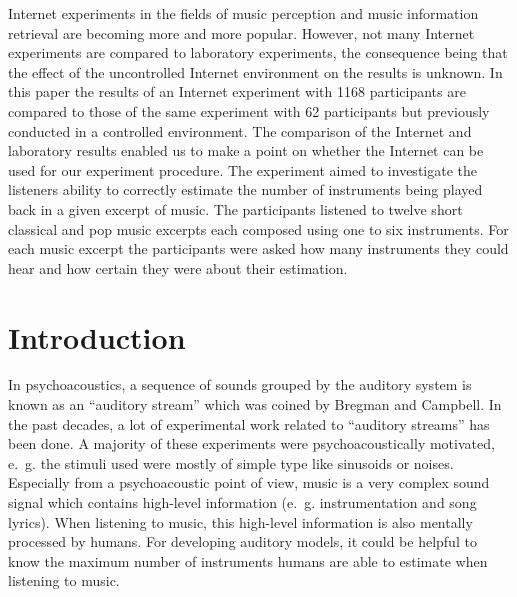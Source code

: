 %

Internet experiments in the fields of music perception and music information retrieval are becoming more and more popular. However, not many Internet experiments are compared to laboratory experiments, the consequence being that the effect of the uncontrolled Internet environment on the results is unknown.
In this paper the results of an Internet experiment with 1168 participants are compared to those of the same experiment with 62 participants but previously conducted in a controlled environment. The comparison of the Internet and laboratory results enabled us to make a point on whether the Internet can be used for our experiment procedure. The experiment aimed to investigate the listeners ability to correctly estimate the number of instruments being played back in a given excerpt of music. The participants listened to twelve short classical and pop music excerpts each composed using one to six instruments. For each music excerpt the participants were asked how many instruments they could hear and how certain they were about their estimation.
%
\section{Introduction}\label{sec:introduction}

In psychoacoustics, a sequence of sounds grouped by the auditory system is known as an ``auditory stream'' which was coined by Bregman and Campbell\cite{Bregman1971}. In the past decades, a lot of experimental work related to ``auditory streams'' has been done\cite{Bregman1990}. A majority of these experiments were psychoacoustically motivated, e.~g. the stimuli used were mostly of simple type like sinusoids or noises. Especially from a psychoacoustic point of view, music is a very complex sound signal which contains high-level information (e.~g. instrumentation and song lyrics). When listening to music, this high-level information is also mentally processed by humans. For developing auditory models, it could be helpful to know the maximum number of instruments humans are able to estimate when listening to music.

